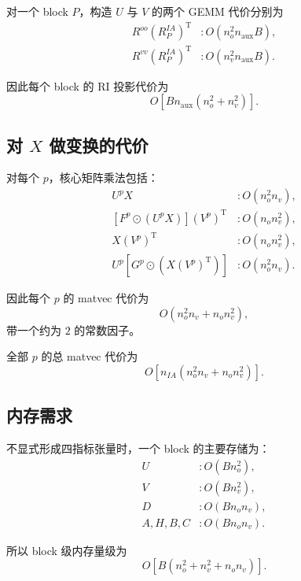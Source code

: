 \documentclass[UTF8,a4paper,11pt]{ctexart}
\newcommand{\Roo}{R^{oo}}
\newcommand{\Rvv}{R^{vv}}
\newcommand{\Ria}{R^{IA}}
\newcommand{\Had}{\odot}
\newcommand{\trans}{\mathrm{T}}
\begin{document}
对一个 block $P$，构造 $U$ 与 $V$ 的两个 GEMM 代价分别为
\begin{align}
\Roo(\Ria_P)^{\trans}
&:
O(n_o^2 n_{\mathrm{aux}} B),
\\
\Rvv(\Ria_P)^{\trans}
&:
O(n_v^2 n_{\mathrm{aux}} B).
\end{align}

因此每个 block 的 RI 投影代价为
\begin{equation}
O\left[
B n_{\mathrm{aux}}(n_o^2+n_v^2)
\right].
\end{equation}

\subsection{对 $X$ 做变换的代价}

对每个 $p$，核心矩阵乘法包括：
\begin{align}
U^pX &: O(n_o^2n_v),
\\
\left[F^p\Had(U^pX)\right](V^p)^{\trans}
&: O(n_on_v^2),
\\
X(V^p)^{\trans}
&: O(n_on_v^2),
\\
U^p\left[G^p\Had(X(V^p)^{\trans})\right]
&: O(n_o^2n_v).
\end{align}

因此每个 $p$ 的 matvec 代价为
\begin{equation}
O\left(n_o^2n_v+n_on_v^2\right),
\end{equation}
带一个约为 $2$ 的常数因子。

全部 $p$ 的总 matvec 代价为
\begin{equation}
O\left[
n_{IA}(n_o^2n_v+n_on_v^2)
\right].
\end{equation}

\subsection{内存需求}

不显式形成四指标张量时，一个 block 的主要存储为：
\begin{align}
U &: O(Bn_o^2),
\\
V &: O(Bn_v^2),
\\
D &: O(Bn_on_v),
\\
A,H,B,C &: O(Bn_on_v).
\end{align}

所以 block 级内存量级为
\begin{equation}
O\left[
B(n_o^2+n_v^2+n_on_v)
\right].
\end{equation}
\end{document}
